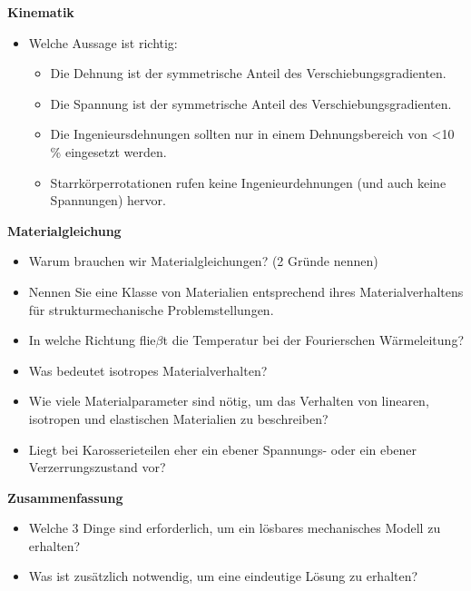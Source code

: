 \begin{framed}

\textbf{Kinematik}

\begin{itemize}
\item Welche Aussage ist richtig:\begin{itemize}
\item Die Dehnung ist der symmetrische Anteil des Verschiebungsgradienten.
\item Die Spannung ist der symmetrische Anteil des Verschiebungsgradienten.
\item Die Ingenieursdehnungen sollten nur in einem Dehnungsbereich von \textless  10 \% eingesetzt werden.
\item Starrkörperrotationen rufen keine Ingenieurdehnungen (und auch keine Spannungen) hervor.
\end{itemize}
\end{itemize}

\textbf{Materialgleichung}

\begin{itemize}
\item Warum brauchen wir Materialgleichungen? (2 Gründe nennen)
\item Nennen Sie eine Klasse von Materialien entsprechend ihres Materialverhaltens für strukturmechanische Problemstellungen.
\item In welche Richtung flie$\beta$t die Temperatur bei der Fourierschen Wärmeleitung?
\item Was bedeutet isotropes Materialverhalten?
\item Wie viele Materialparameter sind nötig, um das Verhalten von linearen, isotropen und elastischen Materialien zu beschreiben?
\item Liegt bei Karosserieteilen eher ein ebener Spannungs- oder ein ebener Verzerrungszustand vor?
\end{itemize}

\textbf{Zusammenfassung}

\begin{itemize}
\item Welche 3 Dinge sind erforderlich, um ein lösbares mechanisches Modell zu erhalten?
\item Was ist zusätzlich notwendig, um eine eindeutige Lösung zu erhalten?
\end{itemize}

\end{framed}